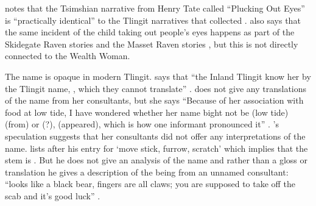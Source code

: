 \citeauthor{boas:1916} notes that the Tsimshian narrative from Henry Tate called “Plucking Out Eyes” \parencite[154–158]{boas:1916} is “practically identical” to the Tlingit narratives that \citeauthor{swanton:1909} collected \parencite[746]{boas:1916}.
\citeauthor{boas:1916} also says that the same incident of the child taking out people’s eyes happens as part of the Skidegate Raven stories \parencite[111]{swanton:1905b} and the Masset Raven stories \parencite[143]{swanton:1905b}, but this is not directly connected to the Wealth Woman.

The name  is opaque in modern Tlingit.
\citeauthor{mcclellan:1975b} says that “the Inland Tlingit know her by the Tlingit name, , which they cannot translate” \parencite[572]{mcclellan:1975b}.
\citeauthor{de-laguna:1972} does not give any translations of the name from her consultants, but she says “Because of her association with food at low tide, I have wondered whether her name bight not be  (low tide)  (from)  or  (?),  (appeared), which is how one informant pronounced it” \parencite[821]{de-laguna:1972}.
\citeauthor{de-laguna:1972}’s speculation suggests that her consultants did not offer any interpretations of the name.
\citeauthor{leer:1973} lists  after his entry for  ‘move stick, furrow, scratch’ which implies that the stem is  \parencite[f03/70]{leer:1973}.
But he does not give an analysis of the name and rather than a gloss or translation he gives a description of the being from an unnamed consultant: “looks like a black bear, fingers are all claws; you are supposed to take off the scab and it’s good luck” \parencite[f03/70]{leer:1973}.

